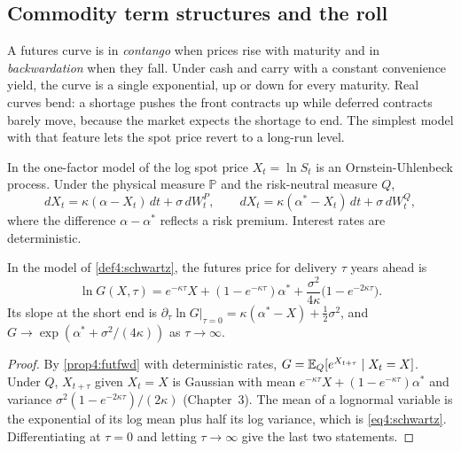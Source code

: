 \begin{chapterrefs}
\section{Commodity term structures and the roll}
\label{sec4:roll}

A futures curve is in \emph{contango} when prices rise with maturity and in \emph{backwardation} when
they fall. Under cash and carry with a constant convenience yield, the curve is a single exponential,
up or down for every maturity. Real curves bend: a shortage pushes the front contracts up while
deferred contracts barely move, because the market expects the shortage to end. The simplest model with
that feature lets the spot price revert to a long-run level.

\begin{definition}\label{def4:schwartz}
In the one-factor model of \textcite{schwartz1997} the log spot price $X_t=\ln S_t$ is an
Ornstein-Uhlenbeck process. Under the physical measure $\mathbb P$ and the risk-neutral measure $Q$,
\begin{equation*}
  dX_t=\kappa(\alpha-X_t)\,dt+\sigma\,dW^P_t,\qquad dX_t=\kappa(\alpha^*-X_t)\,dt+\sigma\,dW^Q_t,
\end{equation*}
where the difference $\alpha-\alpha^*$ reflects a risk premium. Interest rates are deterministic.
\end{definition}

\begin{proposition}\label{prop4:schwartz}
In the model of \cref{def4:schwartz}, the futures price for delivery $\tau$ years ahead is
\begin{equation}\label{eq4:schwartz}
  \ln G(X,\tau)=e^{-\kappa\tau}X+(1-e^{-\kappa\tau})\alpha^*+\frac{\sigma^2}{4\kappa}\bigl(1-e^{-2\kappa\tau}\bigr).
\end{equation}
Its slope at the short end is $\partial_\tau\ln G|_{\tau=0}=\kappa(\alpha^*-X)+\tfrac12\sigma^2$, and
$G\to\exp(\alpha^*+\sigma^2/(4\kappa))$ as $\tau\to\infty$.
\end{proposition}

\begin{proof}
By \cref{prop4:futfwd} with deterministic rates, $G=\mathbb{E}_Q[e^{X_{t+\tau}}\mid X_t=X]$. Under $Q$,
$X_{t+\tau}$ given $X_t=X$ is Gaussian with mean $e^{-\kappa\tau}X+(1-e^{-\kappa\tau})\alpha^*$ and
variance $\sigma^2(1-e^{-2\kappa\tau})/(2\kappa)$ (Chapter~3). The mean of a lognormal variable is the
exponential of its log mean plus half its log variance, which is \cref{eq4:schwartz}. Differentiating
at $\tau=0$ and letting $\tau\to\infty$ give the last two statements.
\end{proof}


\end{chapterrefs}
